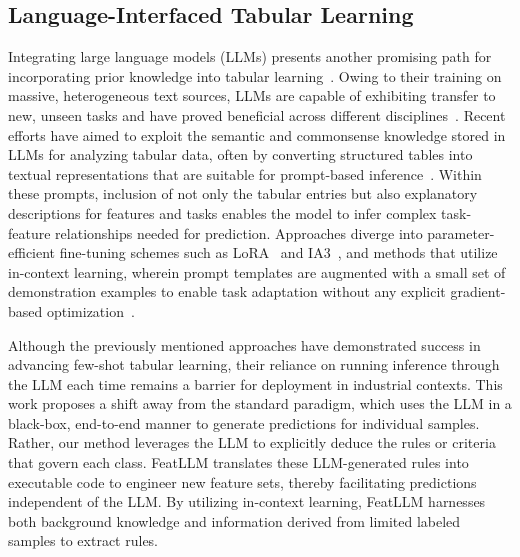 \subsection{Language-Interfaced Tabular Learning} Integrating large language models (LLMs) presents another promising path for incorporating prior knowledge into tabular learning~\cite{anil2023palm,openai2023gpt4}. Owing to their training on massive, heterogeneous text sources, LLMs are capable of exhibiting transfer to new, unseen tasks and have proved beneficial across different disciplines~\cite{brown2020language}. Recent efforts have aimed to exploit the semantic and commonsense knowledge stored in LLMs for analyzing tabular data, often by converting structured tables into textual representations that are suitable for prompt-based inference~\cite{dinh2022lift,hegselmann2023tabllm,wang2023anypredict}. Within these prompts, inclusion of not only the tabular entries but also explanatory descriptions for features and tasks enables the model to infer complex task-feature relationships needed for prediction. Approaches diverge into parameter-efficient fine-tuning schemes such as LoRA~\cite{hu2021lora} and IA3~\cite{liu2022few}, and methods that utilize in-context learning, wherein prompt templates are augmented with a small set of demonstration examples to enable task adaptation without any explicit gradient-based optimization~\cite{dinh2022lift,hegselmann2023tabllm,nam2023semi,slack2023tablet}.

Although the previously mentioned approaches have demonstrated success in advancing few-shot tabular learning, their reliance on running inference through the LLM each time remains a barrier for deployment in industrial contexts. This work proposes a shift away from the standard paradigm, which uses the LLM in a black-box, end-to-end manner to generate predictions for individual samples. Rather, our method leverages the LLM to explicitly deduce the rules or criteria that govern each class. \textsf{FeatLLM} translates these LLM-generated rules into executable code to engineer new feature sets, thereby facilitating predictions independent of the LLM. By utilizing in-context learning, \textsf{FeatLLM} harnesses both background knowledge and information derived from limited labeled samples to extract rules.

